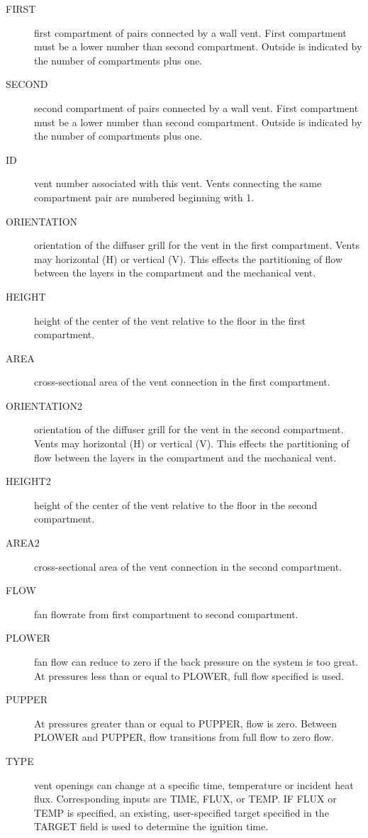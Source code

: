 \begin{adjustwidth}{1cm}{0cm}
\begin{description}
  \item[FIRST] first compartment of pairs connected by a wall vent. First compartment must be a lower number than second compartment. Outside is indicated by the number of compartments plus one.
  \item[SECOND] second compartment of pairs connected by a wall vent. First compartment must be a lower number than second compartment. Outside is indicated by the number of compartments plus one.
  \item[ID] vent number associated with this vent. Vents connecting the same compartment pair are numbered beginning with 1.
  \item[ORIENTATION] orientation of the diffuser grill for the vent in the first compartment. Vents may horizontal (H) or vertical (V). This effects the partitioning of flow between the layers in the compartment and the mechanical vent.
  \item[HEIGHT] height of the center of the vent relative to the floor in the first compartment.
  \item[AREA] cross-sectional area of the vent connection in the first compartment.
  \item[ORIENTATION2] orientation of the diffuser grill for the vent in the second compartment. Vents may horizontal (H) or vertical (V). This effects the partitioning of flow between the layers in the compartment and the mechanical vent.
  \item[HEIGHT2] height of the center of the vent relative to the floor in the second compartment.
  \item[AREA2] cross-sectional area of the vent connection in the second compartment.
  \item[FLOW] fan flowrate from first compartment to second compartment.
  \item[PLOWER] fan flow can reduce to zero if the back pressure on the system is too great. At pressures less than or equal to PLOWER, full flow specified is used.
  \item[PUPPER] At pressures greater than or equal to PUPPER, flow is zero. Between PLOWER and PUPPER, flow transitions from full flow to zero flow.
  \item[TYPE] vent openings can change at a specific time, temperature or incident heat flux. Corresponding inputs are TIME, FLUX, or TEMP.  IF FLUX or TEMP is specified, an existing, user-specified target specified in the TARGET field is used to determine the ignition time.

\end{description}
\end{adjustwidth}
